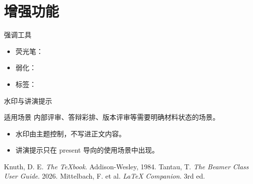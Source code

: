 \section{增强功能}

\begin{frame}{强调工具}
  \begin{itemize}
    \item 荧光笔：
    \item 弱化：
    \item 标签：\;
  \end{itemize}


\end{frame}

\begin{frame}{水印与讲演提示}
  \begin{block}{适用场景}
    内部评审、答辩彩排、版本评审等需要明确材料状态的场景。
  \end{block}
  \begin{itemize}
    \item 水印由主题控制，不写进正文内容。
    \item 讲演提示只在 present 导向的使用场景中出现。
  \end{itemize}
\end{frame}
\cxClearWatermark

\begin{cxReferences}
    Knuth, D. E. \textit{The \TeX book}. Addison-Wesley, 1984.
    Tantau, T. \textit{The Beamer Class User Guide}. 2026.
    Mittelbach, F. et al. \textit{\LaTeX{} Companion}. 3rd ed.
\end{cxReferences}
